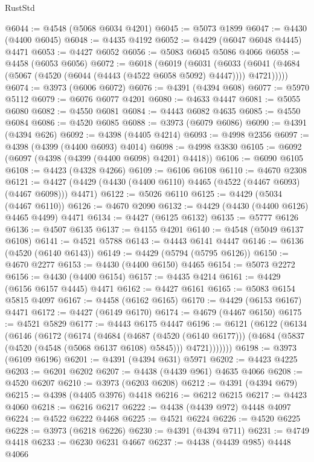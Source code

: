 \begin{lexlean}{RustStd}
\begin{coremodule}
@6044 := @4548 (@5068 @6034 @4201)
@6045 := @5073 @1899
@6047 := @4430 (@4400 @6045)
@6048 := @4435 @4192
@6052 := @4429 (@6047 @6048 @4445) @4471
@6053 := @4427 @6052
@6056 := @5083 @6045 @5086 @4066
@6058 := @4458 (@6053 @6056)
@6072 := @6018
    (@6019
      (@6031
        (@6033 (@6041 (@4684 (@5067 (@4520 (@6044 (@4443 (@4522 @6058 @5092) @4447)))) @4721)))))
@6074 := @3973 (@6006 @6072)
@6076 := @4391 (@4394 @608)
@6077 := @5970 @5112
@6079 := @6076 @6077 @4201
@6080 := @4633 @4447
@6081 := @5055 @6080
@6082 := @4550 @6081
@6084 := @4443 @6082 @4635
@6085 := @4550 @6084
@6086 := @4520 @6085
@6088 := @3973 (@6079 @6086)
@6090 := @4391 (@4394 @626)
@6092 := @4398 (@4405 @4214)
@6093 := @4998 @2356
@6097 := @4398 (@4399 (@4400 @6093) @4014)
@6098 := @4998 @3830
@6105 := @6092 (@6097 (@4398 (@4399 (@4400 @6098) @4201) @4418))
@6106 := @6090 @6105
@6108 := @4423 (@4328 @4266)
@6109 := @6106 @6108
@6110 := @4670 @2308
@6121 := @4427 (@4429 (@4430 (@4400 @6110) @4465 (@4522 (@4467 @6093) (@4467 @6098))) @4471)
@6122 := @5026 @6110
@6125 := @4429 (@5034 (@4467 @6110))
@6126 := @4670 @2090
@6132 := @4429 (@4430 (@4400 @6126) @4465 @4499) @4471
@6134 := @4427 (@6125 @6132)
@6135 := @5777 @6126
@6136 := @4507 @6135
@6137 := @4155 @4201
@6140 := @4548 (@5049 @6137 @6108)
@6141 := @4521 @5788
@6143 := @4443 @6141 @4447
@6146 := @6136 (@4520 (@6140 @6143))
@6149 := @4429 (@5794 (@5795 @6126))
@6150 := @4670 @2277
@6153 := @4430 (@4400 @6150) @4465
@6154 := @5073 @2272
@6156 := @4430 (@4400 @6154)
@6157 := @4435 @4214
@6161 := @4429 (@6156 @6157 @4445) @4471
@6162 := @4427 @6161
@6165 := @5083 @6154 @5815 @4097
@6167 := @4458 (@6162 @6165)
@6170 := @4429 (@6153 @6167) @4471
@6172 := @4427 (@6149 @6170)
@6174 := @4679 (@4467 @6150)
@6175 := @4521 @5829
@6177 := @4443 @6175 @4447
@6196 := @6121
    (@6122
      (@6134
        (@6146
          (@6172
            (@6174
              (@4684
                (@4687 (@4520 (@6140 @6177)))
                (@4684 (@5837 (@4520 (@4548 (@5068 @6137 @6108) @5845))) @4721)))))))
@6198 := @3973 (@6109 @6196)
@6201 := @4391 (@4394 @631) @5971
@6202 := @4423 @4225
@6203 := @6201 @6202
@6207 := @4438 (@4439 @961) @4635 @4066
@6208 := @4520 @6207
@6210 := @3973 (@6203 @6208)
@6212 := @4391 (@4394 @679)
@6215 := @4398 (@4405 @3976) @4418
@6216 := @6212 @6215
@6217 := @4423 @4060
@6218 := @6216 @6217
@6222 := @4438 (@4439 @972) @4448 @4097
@6224 := @4522 @6222 @4468
@6225 := @4521 @6224
@6226 := @4520 @6225
@6228 := @3973 (@6218 @6226)
@6230 := @4391 (@4394 @711)
@6231 := @4749 @4418
@6233 := @6230 @6231 @4667
@6237 := @4438 (@4439 @985) @4448 @4066

\end{coremodule}
\end{lexlean}
